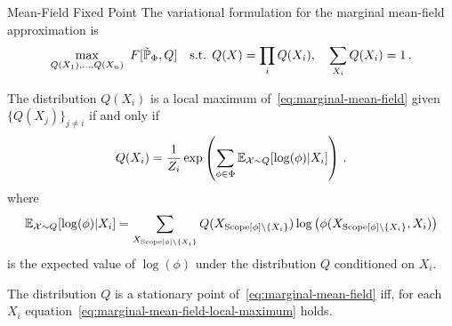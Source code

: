 \begin{frame}{Mean-Field Fixed Point}
The variational formulation for the marginal mean-field approximation is
\begin{equation}
    \label{eq:marginal-mean-field}
    \max_{Q(X_1),\ldots,Q(X_n)}\ F[\tilde{\Pb}_{\Phi}, Q] 
    \quad
    \text{s.t. }  Q(X) = \prod_i Q(X_i), \quad
                  \sum_{X_i} Q(X_i) = 1\,.
\end{equation}
\pause
\begin{theorem}
    \label{thm:local-maximal-marginal-mean-field}
    The distribution $Q(X_i)$ is a local maximum of~\eqref{eq:marginal-mean-field} given $\{Q(X_j)\}_{j \neq i}$ if and only if
    \begin{equation}
        \label{eq:marginal-mean-field-local-maximum}
        Q(X_i) = \frac{1}{Z_i} \exp\left(
             \sum_{\phi \in \Phi} \E_{\mathcal{X} \sim Q}[\log(\phi) | X_i] 
             \right)\,.
    \end{equation}
    where 
    \begin{equation}
        \E_{\mathcal{X} \sim Q}[\log(\phi) | X_i] 
        = 
        \sum_{X_{\Scope[\phi] \backslash \{X_i\}}} Q(X_{\Scope[\phi] \backslash \{X_i\}}) \log\left(\phi(X_{\Scope[\phi] \backslash \{X_i\}}, X_i) \right)
    \end{equation} 
    is the expected value of $\log(\phi)$ under the distribution $Q$ conditioned on $X_i$.
\end{theorem}
\pause
\begin{corollary}
    The distribution $Q$ is a stationary point of~\eqref{eq:marginal-mean-field} iff, for each $X_i$ equation~\eqref{eq:marginal-mean-field-local-maximum} holds.
\end{corollary}
\end{frame}


